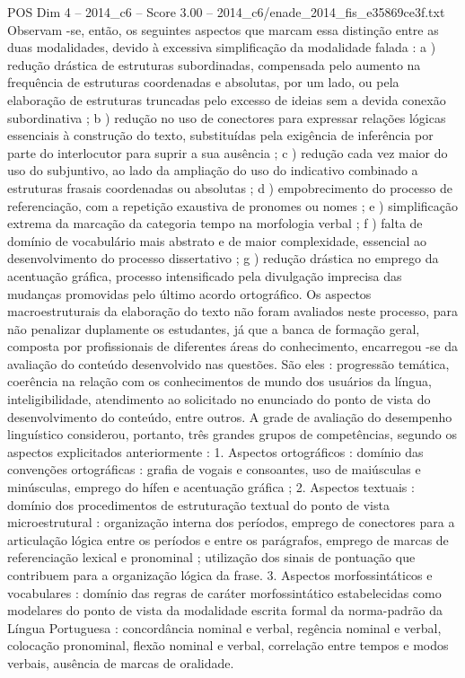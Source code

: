 \begin{textsample}{POS Dim 4 – 2014\_c6 – Score 3.00 – 2014\_c6/enade\_2014\_fis\_e35869ce3f.txt}
Observam -se, então, os seguintes aspectos que marcam essa distinção entre as duas modalidades, devido à excessiva simplificação da modalidade falada : a ) redução drástica de estruturas subordinadas, compensada pelo aumento na frequência de estruturas coordenadas e absolutas, por um lado, ou pela elaboração de estruturas truncadas pelo excesso de ideias sem a devida conexão subordinativa ; b ) redução no uso de conectores para expressar relações lógicas essenciais à construção do texto, substituídas pela exigência de inferência por parte do interlocutor para suprir a sua ausência ; c ) redução cada vez maior do uso do subjuntivo, ao lado da ampliação do uso do indicativo combinado a estruturas frasais coordenadas ou absolutas ; d ) empobrecimento do processo de referenciação, com a repetição exaustiva de pronomes ou nomes ; e ) simplificação extrema da marcação da categoria tempo na morfologia verbal ; f ) falta de domínio de vocabulário mais abstrato e de maior complexidade, essencial ao desenvolvimento do processo dissertativo ; g ) redução drástica no emprego da acentuação gráfica, processo intensificado pela divulgação imprecisa das mudanças promovidas pelo último acordo ortográfico.
Os aspectos macroestruturais da elaboração do texto não foram avaliados neste processo, para não penalizar duplamente os estudantes, já que a banca de formação geral, composta por profissionais de diferentes áreas do conhecimento, encarregou -se da avaliação do conteúdo desenvolvido nas questões.
São eles : progressão temática, coerência na relação com os conhecimentos de mundo dos usuários da língua, inteligibilidade, atendimento ao solicitado no enunciado do ponto de vista do desenvolvimento do conteúdo, entre outros.
A grade de avaliação do desempenho linguístico considerou, portanto, três grandes grupos de competências, segundo os aspectos explicitados anteriormente : 1.
Aspectos ortográficos : domínio das convenções ortográficas : grafia de vogais e consoantes, uso de maiúsculas e minúsculas, emprego do hífen e acentuação gráfica ; 2.
Aspectos textuais : domínio dos procedimentos de estruturação textual do ponto de vista microestrutural : organização interna dos períodos, emprego de conectores para a articulação lógica entre os períodos e entre os parágrafos, emprego de marcas de referenciação lexical e pronominal ; utilização dos sinais de pontuação que contribuem para a organização lógica da frase. 3.
Aspectos morfossintáticos e vocabulares : domínio das regras de caráter morfossintático estabelecidas como modelares do ponto de vista da modalidade escrita formal da norma-padrão da Língua Portuguesa : concordância nominal e verbal, regência nominal e verbal, colocação pronominal, flexão nominal e verbal, correlação entre tempos e modos verbais, ausência de marcas de oralidade.

\end{textsample}
